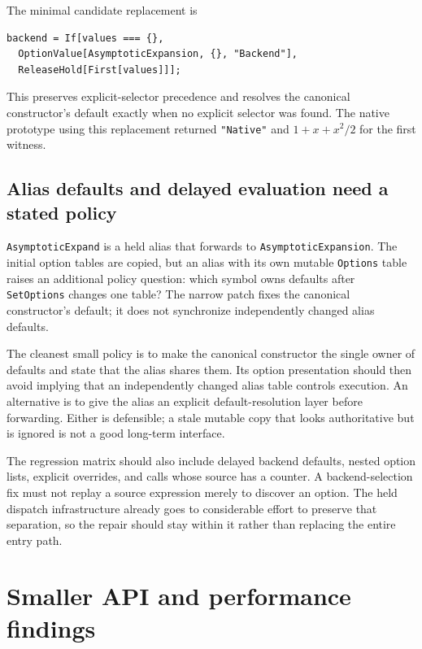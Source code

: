 \documentclass[11pt,letterpaper]{article}
\newcommand{\code}[1]{\nolinkurl{#1}}
\begin{document}
The minimal candidate replacement is
\begin{lstlisting}
backend = If[values === {},
  OptionValue[AsymptoticExpansion, {}, "Backend"],
  ReleaseHold[First[values]]];
\end{lstlisting}
This preserves explicit-selector precedence and resolves the canonical
constructor's default exactly when no explicit selector was found. The native
prototype using this replacement returned \code{"Native"} and $1+x+x^2/2$ for
the first witness.

\subsection{Alias defaults and delayed evaluation need a stated policy}
\code{AsymptoticExpand} is a held alias that forwards to
\code{AsymptoticExpansion}. The initial option tables are copied, but an alias
with its own mutable \code{Options} table raises an additional policy question:
which symbol owns defaults after \code{SetOptions} changes one table? The narrow
patch fixes the canonical constructor's default; it does not synchronize
independently changed alias defaults.~\cite{compatibility}

The cleanest small policy is to make the canonical constructor the single
owner of defaults and state that the alias shares them. Its option presentation
should then avoid implying that an independently changed alias table controls
execution. An alternative is to give the alias an explicit default-resolution
layer before forwarding. Either is defensible; a stale mutable copy that looks
authoritative but is ignored is not a good long-term interface.

The regression matrix should also include delayed backend defaults, nested
option lists, explicit overrides, and calls whose source has a counter. A
backend-selection fix must not replay a source expression merely to discover
an option. The held dispatch infrastructure already goes to considerable effort
to preserve that separation, so the repair should stay within it rather than
replacing the entire entry path.~\cite{compatibility,nativecontracts}

\section{Smaller API and performance findings}
\end{document}
